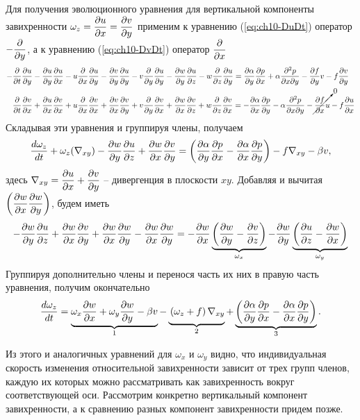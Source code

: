 Для получения эволюционного уравнения для вертикальной компоненты завихренности $\omega_z = \pd{u}{x}=\pd{v}{y}$ применим к уравнению (\ref{eq:ch10-DuDt}) оператор $-\pd{}{y}$, а к уравнению (\ref{eq:ch10-DvDt}) оператор $\pd{}{x}$ 
\begin{align*}
    -&\pd{}{t}\pd{u}{y}-\pd{u}{y}\pd{u}{x}-u\pd{}{x}\pd{u}{y}-\pd{v}{y}\pd{u}{y} - 
    v\pd{}{y}\pd{u}{y}-\pd{w}{y}\pd{u}{z}-w\pd{}{z}\pd{u}{y} = 
    \pd{\alpha}{y}\pd{p}{x}+\alpha\frac{\partial^2p}{\partial x \partial y} - \pd{f}{y}v - f\pd{v}{y} \\
    &\pd{}{t}\pd{v}{x}+\pd{u}{x}\pd{v}{x}+u\pd{}{x}\pd{v}{x}+\pd{v}{x}\pd{v}{y} +
    v\pd{}{y}\pd{v}{x}+\pd{w}{x}\pd{v}{z}+w\pd{}{z}\pd{v}{x} = 
    -\pd{\alpha}{x}\pd{p}{y}-\alpha\frac{\partial^2p}{\partial x \partial y} - \cancelto{0}{\pd{f}{x}u} - f\pd{u}{x} \\
\end{align*}
Складывая эти уравнения и группируя члены, получаем
\begin{equation*}
    \td{\omega_z}{t}+\omega_z(\nabla_{xy})-\pd{w}{y}\pd{u}{z}+\pd{w}{x}\pd{v}{y} = \left( \pd{\alpha}{y}\pd{p}{x} - \pd{\alpha}{x}\pd{p}{y} \right) - f\nabla_{xy} - \beta v,
\end{equation*}
здесь $\nabla_{xy}=\pd{u}{x}+\pd{v}{y}$ -- дивергенция в плоскости $xy$. Добавляя и вычитая $\left( \pd{w}{x}\pd{w}{y} \right)$, будем иметь
\begin{equation*}
    -\pd{w}{y}\pd{u}{z}+\pd{w}{x}\pd{v}{y}+\pd{w}{x}\pd{w}{y}-\pd{w}{x}\pd{w}{y} = 
    -\pd{w}{x} \underbrace{ \left( \pd{w}{y} - \pd{v}{z} \right) }_{\omega_x} 
    -\pd{w}{y} \underbrace{ \left( \pd{u}{z} - \pd{w}{x} \right) }_{\omega_y} 
\end{equation*}
Группируя дополнительно члены и перенося часть их них в правую часть уравнения, получим окончательно
\begin{equation}
\label{eq:ch10_omegaz}
    \td{\omega_z}{t}=
    \underbrace{\omega_x\pd{w}{x} + \omega_y\pd{w}{y} -\beta v }_{1} - 
    \underbrace{\vphantom{(\omega_z+f)\pd{v}{z} + \omega_x\pd{v}{x}}
    \left( \omega_z + f \right) \nabla_{xy}}_{2}+
    \underbrace{\left( \pd{\alpha}{y}\pd{p}{x} - \pd{\alpha}{x}\pd{p}{y} \right)}_{3}.
\end{equation}

Из этого и аналогичных уравнений для $\omega_x$ и $\omega_y$ видно, что индивидуальная скорость изменения относительной завихренности зависит от трех групп членов, каждую их которых можно рассматривать как завихренность вокруг соответствующей оси. Рассмотрим конкретно вертикальный компонент завихренности, а к сравнению разных компонент завихренности придем позже. 

